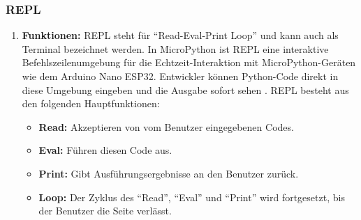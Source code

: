 \subsubsection{REPL}
\begin{enumerate}
	
	\item \textbf{Funktionen:} REPL steht für ``Read-Eval-Print Loop'' und kann auch als Terminal bezeichnet werden. In MicroPython ist REPL eine interaktive Befehlszeilenumgebung für die Echtzeit-Interaktion mit MicroPython-Geräten wie dem Arduino Nano ESP32. Entwickler können Python-Code direkt in diese Umgebung eingeben und die Ausgabe sofort sehen \cite{VanBinsbergen:2020}. REPL besteht aus den folgenden Hauptfunktionen:
	\begin{itemize}
		\item \textbf{Read:} Akzeptieren von vom Benutzer eingegebenen Codes.
		\item \textbf{Eval:} Führen diesen Code aus.
		\item \textbf{Print:} Gibt Ausführungsergebnisse an den Benutzer zurück.
		\item \textbf{Loop:} Der Zyklus des ``Read'', ``Eval'' und ``Print'' wird fortgesetzt, bis der Benutzer die Seite verlässt.
	\end{itemize}
	

\end{enumerate}
